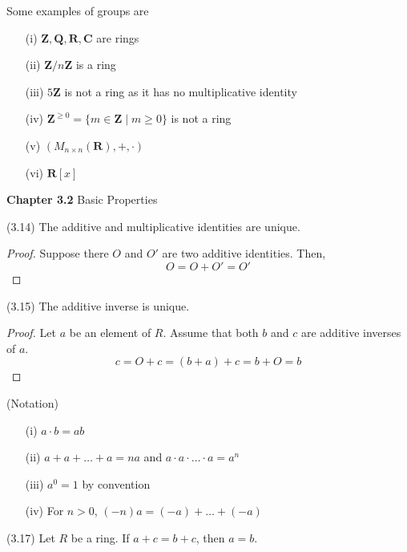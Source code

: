 \vspace{2ex}
\begin{ex}
Some examples of groups are
\begin{itemize}
	\item[(i)] ${\bm Z}, {\bm Q},{\bm R},{\bm C}$ are rings
	\item[(ii)] ${\bm Z}/n{\bm Z}$ is a ring
	\item[(iii)] $5{\bm Z}$ is not a ring as it has no multiplicative identity
	\item[(iv)] ${\bm Z}^{\geq 0}=\{m\in {\bm Z} \;|\; m\geq 0\}$ is not a ring
	\item[(v)] $(M_{n\times n}({\bm R}),+,\cdot )$
	\item[(vi)] ${\bm R}[x]$
\end{itemize}
\end{ex}
\vspace{2ex}
{\bf Chapter 3.2}\hspace{2ex} Basic Properties
\\
\begin{prop}
(3.14) The additive and multiplicative identities are unique.
\end{prop}
\vspace{2ex}
\begin{proof}
Suppose there $O$ and $O'$ are two additive identities. Then,
\[O=O+O'=O'\]
\end{proof}
\vspace{2ex}
\begin{prop}
 (3.15) The additive inverse is unique.
\end{prop}
\vspace{2ex}
\begin{proof}
Let $a$ be an element of $R$. Assume that both $b$ and $c$ are additive inverses of $a$.
\[c=O+c=(b+a)+c=b+O=b\]
\end{proof}
\vspace{2ex}
\begin{rmk}
(Notation)
\begin{itemize}
	\item[(i)] $a\cdot b=ab$
	\item[(ii)] $a+a+\ldots +a=na$ and $a\cdot a\cdot \ldots \cdot a=a^{n}$
	\item[(iii)] $a^{0}=1$ by convention
	\item[(iv)] For $n>0$, $(-n)a=(-a)+\ldots +(-a)$
\end{itemize}
\end{rmk}
\vspace{2ex}
\begin{prop}
(3.17) Let $R$ be a ring. If $a+c=b+c$, then $a=b$. 
\end{prop}
\vspace{2ex}

